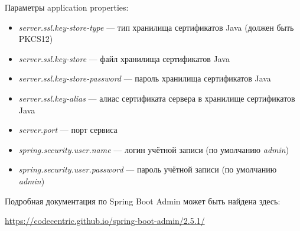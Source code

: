 \documentclass[../user-manual.tex]{subfiles}
\begin{document}
	Параметры application properties:
	
	\begin{itemize}
		\item \textit{server.ssl.key-store-type} --- тип хранилища сертификатов Java (должен быть PKCS12)
		\item \textit{server.ssl.key-store} --- файл хранилища сертификатов Java
		\item \textit{server.ssl.key-store-password} --- пароль хранилища сертификатов Java
		\item \textit{server.ssl.key-alias} --- алиас сертификата сервера в хранилище сертификатов Java
		\item \textit{server.port} --- порт сервиса
		\item \textit{spring.security.user.name} --- логин учётной записи (по умолчанию \textit{admin})
		\item \textit{spring.security.user.password} --- пароль учётной записи (по умолчанию \textit{admin})
	\end{itemize}
	
	Подробная документация по Spring Boot Admin может быть найдена здесь:
	
	\begin{center}
		\href{	https://codecentric.github.io/spring-boot-admin/2.5.1/}{	https://codecentric.github.io/spring-boot-admin/2.5.1/}
	\end{center}
	
\end{document}
